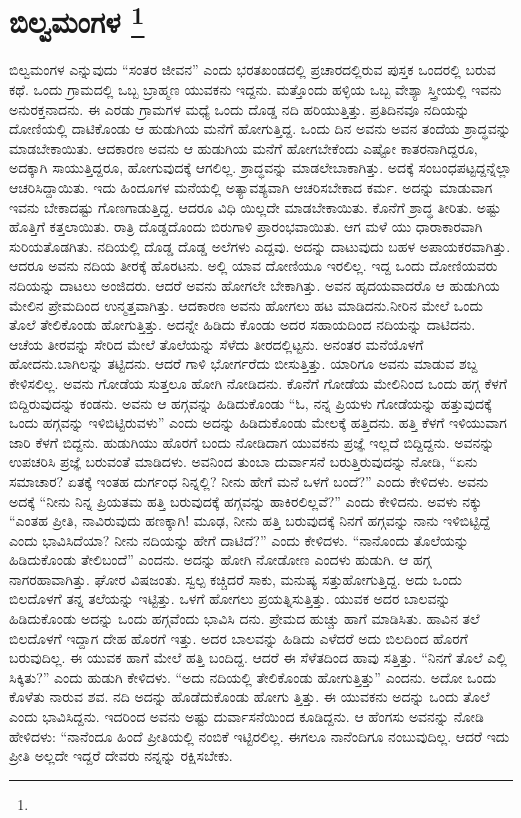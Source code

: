 
\chapter[ಬಿಲ್ವಮಂಗಳ ]{ಬಿಲ್ವಮಂಗಳ \protect\footnote{}}

ಬಿಲ್ವಮಂಗಳ ಎನ್ನುವುದು “ಸಂತರ ಜೀವನ” ಎಂದು ಭರತಖಂಡದಲ್ಲಿ ಪ್ರಚಾರದಲ್ಲಿರುವ ಪುಸ್ತಕ ಒಂದರಲ್ಲಿ ಬರುವ ಕಥೆ. ಒಂದು ಗ್ರಾಮದಲ್ಲಿ ಒಬ್ಬ ಬ್ರಾಹ್ಮಣ ಯುವಕನು ಇದ್ದನು. ಮತ್ತೊಂದು ಹಳ್ಳಿಯ ಒಬ್ಬ ವೇಶ್ಯಾ ಸ್ತ್ರೀಯಲ್ಲಿ ಇವನು ಅನುರಕ್ತನಾದನು. ಈ ಎರಡು ಗ್ರಾಮಗಳ ಮಧ್ಯೆ ಒಂದು ದೊಡ್ಡ ನದಿ ಹರಿಯುತ್ತಿತ್ತು. ಪ್ರತಿದಿನವೂ ನದಿಯನ್ನು ದೋಣಿಯಲ್ಲಿ ದಾಟಿಕೊಂಡು ಆ ಹುಡುಗಿಯ ಮನೆಗೆ ಹೋಗುತ್ತಿದ್ದ. ಒಂದು ದಿನ ಅವನು ಅವನ ತಂದೆಯ ಶ್ರಾದ್ಧವನ್ನು ಮಾಡಬೇಕಾಯಿತು. ಆದಕಾರಣ ಅವನು ಆ ಹುಡುಗಿಯ ಮನೆಗೆ ಹೋಗಬೇಕೆಂದು ಎಷ್ಟೋ ಕಾತರನಾಗಿದ್ದರೂ, ಅದಕ್ಕಾಗಿ ಸಾಯುತ್ತಿದ್ದರೂ, ಹೋಗುವುದಕ್ಕೆ ಆಗಲಿಲ್ಲ. ಶ್ರಾದ್ಧವನ್ನು ಮಾಡಲೇಬಾಕಾಗಿತ್ತು. ಅದಕ್ಕೆ ಸಂಬಂಧಪಟ್ಟದ್ದನ್ನೆಲ್ಲಾ ಆಚರಿಸಿದ್ದಾಯಿತು. ಇದು ಹಿಂದೂಗಳ ಮನೆಯಲ್ಲಿ ಅತ್ಯಾವಶ್ಯವಾಗಿ ಆಚರಿಸಬೇಕಾದ ಕರ್ಮ. ಅದನ್ನು ಮಾಡುವಾಗ ಇವನು ಬೇಕಾದಷ್ಟು ಗೊಣಗಾಡುತ್ತಿದ್ದ. ಆದರೂ ವಿಧಿ ಯಿಲ್ಲದೇ ಮಾಡಬೇಕಾಯಿತು. ಕೊನೆಗೆ ಶ್ರಾದ್ಧ ತೀರಿತು. ಅಷ್ಟು ಹೊತ್ತಿಗೆ ಕತ್ತಲಾಯಿತು. ರಾತ್ರಿ ದೊಡ್ಡದೊಂದು ಬಿರುಗಾಳಿ ಪ್ರಾರಂಭವಾಯಿತು. ಆಗ ಮಳೆ ಯು ಧಾರಾಕಾರವಾಗಿ ಸುರಿಯತೊಡಗಿತು. ನದಿಯಲ್ಲಿ ದೊಡ್ಡ ದೊಡ್ಡ ಅಲೆಗಳು ಎದ್ದವು. ಅದನ್ನು ದಾಟುವುದು ಬಹಳ ಅಪಾಯಕರವಾಗಿತ್ತು. ಆದರೂ ಅವನು ನದಿಯ ತೀರಕ್ಕೆ ಹೊರಟನು. ಅಲ್ಲಿ ಯಾವ ದೋಣಿಯೂ ಇರಲಿಲ್ಲ. ಇದ್ದ ಒಂದು ದೋಣಿಯವರು ನದಿಯನ್ನು ದಾಟಲು ಅಂಜಿದರು. ಆದರೆ ಅವನು ಹೋಗಲೇ ಬೇಕಾಗಿತ್ತು. ಅವನ ಹೃದಯವಾದರೊ ಆ ಹುಡುಗಿಯ ಮೇಲಿನ ಪ್ರೇಮದಿಂದ ಉನ್ಮತ್ತವಾಗಿತ್ತು. ಆದಕಾರಣ ಅವನು ಹೋಗಲು ಹಟ ಮಾಡಿದನು.ನೀರಿನ ಮೇಲೆ ಒಂದು ತೊಲೆ ತೇಲಿಕೊಂಡು ಹೋಗುತ್ತಿತ್ತು. ಅದನ್ನೇ ಹಿಡಿದು ಕೊಂಡು ಅದರ ಸಹಾಯದಿಂದ ನದಿಯನ್ನು ದಾಟಿದನು. ಆಚೆಯ ತೀರವನ್ನು ಸೇರಿದ ಮೇಲೆ ತೊಲೆಯನ್ನು ಸೆಳೆದು ತೀರದಲ್ಲಿಟ್ಟನು. ಅನಂತರ ಮನೆಯೊಳಗೆ ಹೋದನು.\break ಬಾಗಿಲನ್ನು ತಟ್ಟಿದನು. ಆದರೆ ಗಾಳಿ ಭೋರ್ಗರೆದು ಬೀಸುತ್ತಿತ್ತು. ಯಾರಿಗೂ ಅವನು ಮಾಡುವ ಶಬ್ದ ಕೇಳಿಸಲಿಲ್ಲ. ಅವನು ಗೋಡೆಯ ಸುತ್ತಲೂ ಹೋಗಿ ನೋಡಿದನು. ಕೊನೆಗೆ ಗೋಡೆಯ ಮೇಲಿನಿಂದ ಒಂದು ಹಗ್ಗ ಕೆಳಗೆ ಬಿದ್ದಿರುವುದನ್ನು ಕಂಡನು. ಅವನು ಆ ಹಗ್ಗವನ್ನು ಹಿಡಿದುಕೊಂಡು “ಓ, ನನ್ನ ಪ್ರಿಯಳು ಗೋಡೆಯನ್ನು ಹತ್ತುವುದಕ್ಕೆ ಒಂದು ಹಗ್ಗವನ್ನು ಇಳಿಬಿಟ್ಟಿರುವಳು” ಎಂದು ಅದನ್ನು ಹಿಡಿದುಕೊಂಡು ಮೇಲಕ್ಕೆ ಹತ್ತಿದನು. ಹತ್ತಿ ಕೆಳಗೆ ಇಳಿಯುವಾಗ ಜಾರಿ ಕೆಳಗೆ ಬಿದ್ದನು. ಹುಡುಗಿಯು ಹೊರಗೆ ಬಂದು ನೋಡಿದಾಗ ಯುವಕನು ಪ್ರಜ್ಞೆ ಇಲ್ಲದೆ ಬಿದ್ದಿದ್ದನು. ಅವನನ್ನು ಉಪಚರಿಸಿ ಪ್ರಜ್ಞೆ ಬರುವಂತೆ ಮಾಡಿದಳು. ಅವನಿಂದ ತುಂಬಾ ದುರ್ವಾಸನೆ ಬರುತ್ತಿರುವುದನ್ನು ನೋಡಿ, “ಏನು ಸಮಾಚಾರ? ಏತಕ್ಕೆ ಇಂತಹ ದುರ್ಗಂಧ ನಿನ್ನಲ್ಲಿ? ನೀನು ಹೇಗೆ ಮನೆ ಒಳಗೆ ಬಂದೆ?” ಎಂದು ಕೇಳಿದಳು. ಅವನು ಅದಕ್ಕೆ “ನೀನು ನಿನ್ನ ಪ್ರಿಯತಮ ಹತ್ತಿ ಬರುವುದಕ್ಕೆ ಹಗ್ಗವನ್ನು ಹಾಕಿರಲಿಲ್ಲವೆ?” ಎಂದು ಕೇಳಿದನು. ಅವಳು ನಕ್ಕು “ಎಂತಹ ಪ್ರೀತಿ, ನಾವಿರುವುದು ಹಣಕ್ಕಾಗಿ! ಮೂಢ, ನೀನು ಹತ್ತಿ ಬರುವುದಕ್ಕೆ ನಿನಗೆ ಹಗ್ಗವನ್ನು ನಾನು ಇಳಿಬಿಟ್ಟಿದ್ದೆ ಎಂದು ಭಾವಿಸಿದೆಯಾ? ನೀನು ನದಿಯನ್ನು ಹೇಗೆ ದಾಟಿದೆ?” ಎಂದು ಕೇಳಿದಳು. “ನಾನೊಂದು ತೊಲೆಯನ್ನು ಹಿಡಿದುಕೊಂಡು ತೇಲಿಬಂದೆ” ಎಂದನು. ಅದನ್ನು ಹೋಗಿ ನೋಡೋಣ ಎಂದಳು ಹುಡುಗಿ. ಆ ಹಗ್ಗ ನಾಗರಹಾವಾಗಿತ್ತು. ಘೋರ ವಿಷಜಂತು. ಸ್ವಲ್ಪ ಕಚ್ಚಿದರೆ ಸಾಕು, ಮನುಷ್ಯ ಸತ್ತುಹೋಗುತ್ತಿದ್ದ. ಅದು ಒಂದು ಬಿಲದೊಳಗೆ ತನ್ನ ತಲೆಯನ್ನು ಇಟ್ಟಿತ್ತು. ಒಳಗೆ ಹೋಗಲು ಪ್ರಯತ್ನಿಸುತ್ತಿತ್ತು. ಯುವಕ ಅದರ ಬಾಲವನ್ನು ಹಿಡಿದುಕೊಂಡು ಅದನ್ನು ಒಂದು ಹಗ್ಗವೆಂದು ಭಾವಿಸಿ ದನು. ಪ್ರೇಮದ ಹುಚ್ಚು ಹಾಗೆ ಮಾಡಿಸಿತು. ಹಾವಿನ ತಲೆ ಬಿಲದೊಳಗೆ ಇದ್ದಾಗ ದೇಹ ಹೊರಗೆ ಇತ್ತು. ಅದರ ಬಾಲವನ್ನು ಹಿಡಿದು ಎಳೆದರೆ ಅದು ಬಿಲದಿಂದ ಹೊರಗೆ ಬರುವುದಿಲ್ಲ. ಈ ಯುವಕ ಹಾಗೆ ಮೇಲೆ ಹತ್ತಿ ಬಂದಿದ್ದ. ಆದರೆ ಈ ಸೆಳೆತದಿಂದ ಹಾವು ಸತ್ತಿತ್ತು. “ನಿನಗೆ ತೊಲೆ ಎಲ್ಲಿ ಸಿಕ್ಕಿತು?” ಎಂದು ಹುಡುಗಿ ಕೇಳಿದಳು. “ಅದು ನದಿಯಲ್ಲಿ ತೇಲಿಕೊಂಡು ಹೋಗುತ್ತಿತ್ತು” ಎಂದನು. ಅದೋ ಒಂದು ಕೊಳೆತು ನಾರುವ ಶವ. ನದಿ ಅದನ್ನು ಹೊಡೆದುಕೊಂಡು ಹೋಗು ತ್ತಿತ್ತು. ಈ ಯುವಕನು ಅದನ್ನು ಒಂದು ತೊಲೆ ಎಂದು ಭಾವಿಸಿದ್ದನು. ಇದರಿಂದ ಅವನು ಅಷ್ಟು ದುರ್ವಾಸನೆಯಿಂದ ಕೂಡಿದ್ದನು. ಆ ಹೆಂಗಸು ಅವನನ್ನು ನೋಡಿ ಹೇಳಿದಳು: “ನಾನೆಂದೂ ಹಿಂದೆ ಪ್ರೀತಿಯಲ್ಲಿ ನಂಬಿಕೆ ಇಟ್ಟಿರಲಿಲ್ಲ. ಈಗಲೂ ನಾನೆಂದಿಗೂ ನಂಬುವುದಿಲ್ಲ. ಆದರೆ ಇದು ಪ್ರೀತಿ ಅಲ್ಲದೇ ಇದ್ದರೆ ದೇವರು ನನ್ನನ್ನು ರಕ್ಷಿಸಬೇಕು. 